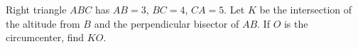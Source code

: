Right triangle $ABC$ has $AB=3$, $BC=4$, $CA=5$. Let $K$ be the intersection of the altitude from $B$ and the perpendicular bisector of $AB$. If $O$ is the circumcenter, find $KO$.
